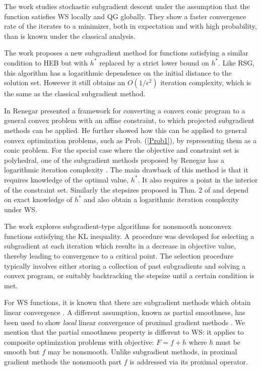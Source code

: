\documentclass[smallextended]{svjour3}
\begin{document}
The work \cite{lim2011convergence} studies stochastic subgradient descent under the assumption that the function satisfies WS locally and QG globally. They show a faster convergence rate of the iterates to a minimizer, both in expectation and with high probability, than is known under the classical analysis. 

The work \cite{freund2015new} proposes a new subgradient method for functions satisfying a similar condition to HEB but with $h^*$ replaced by a strict lower bound on $h^*$. Like RSG, this algorithm has a logarithmic dependence on the initial distance to the solution set. However it still obtains an $O(1/\epsilon^2)$ iteration complexity, which is the same as the classical subgradient method.

In \cite{renegar2015framework,renegar2016efficient} Renegar presented a framework for converting a convex conic program to a general convex problem with an affine constraint, to which projected subgradient methods can be applied. He further showed how this can be applied to general convex optimization problems, such as Prob. (\ref{Prob1}), by representing them as a conic problem. For the special case where the objective and constraint set is polyhedral, one of the subgradient methods proposed by Renegar has a logarithmic iteration complexity \cite[Cor. 3.4]{renegar2015framework}. The main drawback of this method is that it requires knowledge of the optimal value, $h^*$. It also requires a point in the interior of the constraint set. Similarly the stepsizes proposed in Thm. 2 of \cite[Sec 5.3.]{PolyakIntro} and \cite[Prop. 2.11]{nedic2001convergence} depend on exact knowledge of $h^*$ and also obtain a logarithmic iteration complexity under WS. 

The work \cite{noll2014convergence} explores subgradient-type algorithms for nonsmooth nonconvex functions satisfying the KL inequality. A procedure was developed for selecting a subgradient at each iteration which results in a decrease in objective value, thereby leading to convergence to a critical point. The selection procedure typically involves either storing a collection of past subgradients and solving a convex program, or suitably backtracking the stepsize until a certain condition is met.

For WS functions, it is known that there are subgradient methods which obtain linear convergence \cite{goffin1977convergence,shor2012minimization,yang2015rsg}. A different assumption, known as partial smoothness, has been used to show \emph{local} linear convergence of proximal gradient methods \cite{hare2004identifying,liang2017activity}. We mention that the partial smoothness property is different to WS: it applies to composite optimization problems with objective: $F = f+h$ where $h$ must be smooth but $f$ may be nonsmooth. Unlike subgradient methods, in proximal gradient methods the nonsmooth part $f$ is addressed via its proximal operator. 
\end{document}
